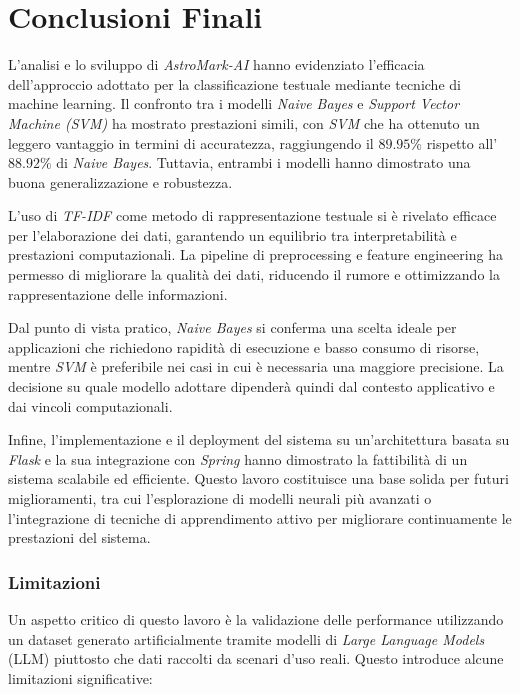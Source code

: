 \chapter{Conclusioni Finali}
L'analisi e lo sviluppo di \textit{AstroMark-AI} hanno evidenziato l'efficacia dell'approccio adottato per la classificazione testuale mediante tecniche di machine learning. Il confronto tra i modelli \textit{Naive Bayes} e \textit{Support Vector Machine (SVM)} ha mostrato prestazioni simili, con \textit{SVM} che ha ottenuto un leggero vantaggio in termini di accuratezza, raggiungendo il $89.95\%$ rispetto all'$88.92\%$ di \textit{Naive Bayes}. Tuttavia, entrambi i modelli hanno dimostrato una buona generalizzazione e robustezza.

L'uso di \textit{TF-IDF} come metodo di rappresentazione testuale si è rivelato efficace per l'elaborazione dei dati, garantendo un equilibrio tra interpretabilità e prestazioni computazionali. La pipeline di preprocessing e feature engineering ha permesso di migliorare la qualità dei dati, riducendo il rumore e ottimizzando la rappresentazione delle informazioni.

Dal punto di vista pratico, \textit{Naive Bayes} si conferma una scelta ideale per applicazioni che richiedono rapidità di esecuzione e basso consumo di risorse, mentre \textit{SVM} è preferibile nei casi in cui è necessaria una maggiore precisione. La decisione su quale modello adottare dipenderà quindi dal contesto applicativo e dai vincoli computazionali.

Infine, l'implementazione e il deployment del sistema su un'architettura basata su \textit{Flask} e la sua integrazione con \textit{Spring} hanno dimostrato la fattibilità di un sistema scalabile ed efficiente. Questo lavoro costituisce una base solida per futuri miglioramenti, tra cui l'esplorazione di modelli neurali più avanzati o l'integrazione di tecniche di apprendimento attivo per migliorare continuamente le prestazioni del sistema.

\subsection{Limitazioni}
Un aspetto critico di questo lavoro è la validazione delle performance utilizzando un dataset generato artificialmente tramite modelli di \textit{Large Language Models} (LLM) piuttosto che dati raccolti da scenari d’uso reali. Questo introduce alcune limitazioni significative:

